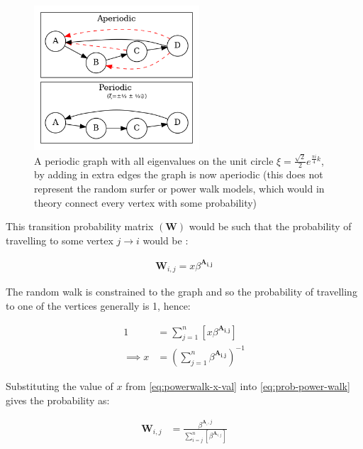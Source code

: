 \documentclass[11pt]{report}
\begin{document}
 \begin{figure}
 \includegraphics[width=0.55\textwidth]{media/dot/aperiodic.dot.png}
 \caption{\label{fig:aperiodic}A periodic graph with all eigenvalues on the unit circle \(\xi = \frac{\sqrt{2}}{2} e^{\frac{\pi i}{4} k}\), by adding in extra edges the graph is now aperiodic (this does not represent the random surfer or power walk models, which would in theory connect every vertex with some probability)}
\end{figure}

This transition probability matrix \(\left( \mathbf{W}\right)\) would be such that the probability of
travelling to some vertex \(j \rightarrow i\) would be \cite{parkPowerWalkRevisiting2013}:

\begin{align}
\mathbf{W}_{i, j} = x\beta^{\mathbf{A_{i,j}}} \label{eq:prob-power-walk}
\end{align}

The random walk is constrained to the graph and so the probability of travelling
to one of the vertices generally is 1, hence:


\begin{align}
      1 &= \sum^{n}_{j= 1}   \left[ x \beta^{\mathbf{A_{i,j}}} \right] \\
       \implies  x&= \left( \sum^{n}_{j= 1}   \beta^{\mathbf{A_{i,j}}}
       \right)^{-1} \label{eq:powerwalk-x-val}
\end{align}

Substituting the value of \(x\) from \eqref{eq:powerwalk-x-val} into \eqref{eq:prob-power-walk} gives the probability as:

\begin{align}
      \mathbf{W}_{i,j} &= \frac{\beta^{\mathbf{A}__i,j}}{\sum^{n}_{i=j}
      \left[ \beta^{\mathbf{A}_{i,j}} \right] } \label{eq:power-walk-recurrence}
\end{align}
\end{document}
